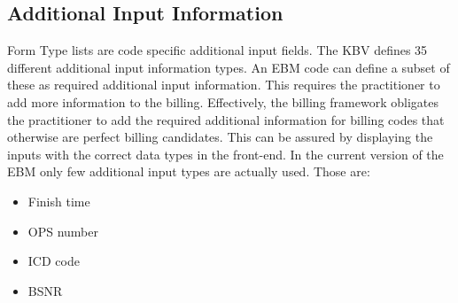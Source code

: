 \subsection{Additional Input Information}\label{subsec:additional-information}
Form Type lists are code specific additional input fields.
The KBV defines 35 different additional input information types.
An EBM code can define a subset of these as required additional input information.
This requires the practitioner to add more information to the billing.
Effectively, the billing framework obligates the practitioner to add the required additional information for billing codes that otherwise are perfect billing candidates.
This can be assured by displaying the inputs with the correct data types in the front-end.
In the current version of the EBM only few additional input types are actually used.
Those are:
\begin{itemize}
    \item Finish time
    \item OPS number
    \item ICD code
    \item BSNR
\end{itemize}